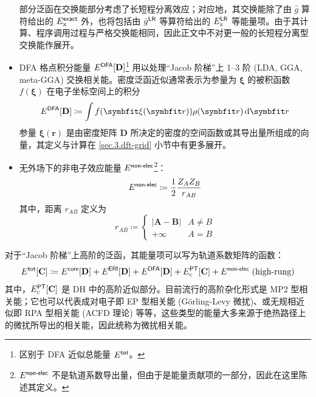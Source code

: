 \begin{itemize}[nosep]
\begin{equation}
\end{equation}
部分泛函在交换能部分考虑了长短程分离效应；对应地，其交换能除了由 $\hat g$ 算符给出的 $E_\mathrm{x}^{\textsf{exact}}$ 外，也将包括由 $\hat g^{\textsf{LR}}$ 等算符给出的 $E_\mathrm{x}^{\textsf{LR}}$ 等能量项。由于其计算、程序调用过程与严格交换能相同，因此正文中不对更一般的长短程分离型交换能作展开。
\item DFA 格点积分能量 $E^{\textsf{DFA}} [\mathbf{D}]$\footnote{区别于 DFA 近似总能量 $E^{\textsf{tot}}$。} 用以处理“Jacob 阶梯”上 1--3 阶 (LDA, GGA, meta-GGA) 交换相关能。密度泛函近似通常表示为参量为 $\bm{\xi}$ 的被积函数 $f(\bm{\xi})$ 在电子坐标空间上的积分
\begin{equation}
    \label{eq.3.def.dfa-energy}
    E^\textmt{DFA} [\mathbf{D}] \coloneq \int f(\bm{\xi}(\bm{r})) \rho (\bm{r}) \, \mathrm{d} \bm{r}
\end{equation}
参量 $\bm{\xi} (\bm{r})$ 是由密度矩阵 $\mathbf{D}$ 所决定的密度的空间函数或其导出量所组成的向量，其定义与计算在 \ref{sec.3.dft-grid} 小节中有更多展开。
\item 无外场下的非电子效应能量 $E^{\textsf{non-elec}}$\footnote{$E^{\textsf{non-elec}}$ 不是轨道系数导出量，但由于是能量贡献项的一部分，因此在这里陈述其定义。}：
\begin{equation}
    E^{\textsf{non-elec}} \coloneq \frac{1}{2} \frac{Z_A Z_B}{r_{AB}}
\end{equation}
其中，距离 $r_{AB}$ 定义为
\begin{equation*}
    r_{AB} \coloneq
    \begin{cases}
        | \boldsymbol{A} - \boldsymbol{B} | & A \neq B \\
        + \infty & A = B
    \end{cases}
\end{equation*}
\end{itemize}

对于“Jacob 阶梯”上高阶的泛函，其能量项可以写为轨道系数矩阵的函数：
\begin{equation}
    E^{\textsf{tot}}[\mathbf{C}] \coloneq E^{\textsf{core}} [\mathbf{D}] + E^{\textsf{ERI}} [\mathbf{D}] + E^{\textsf{DFA}} [\mathbf{D}] + E_\mathrm{c}^{\textsf{PT}} [\mathbf{C}] + E^{\textsf{non-elec}} \; \text{(high-rung)}
\end{equation}
其中，$E_\mathrm{c}^{\textsf{PT}} [\mathbf{C}]$ 是 DH 中的高阶近似部分。目前流行的高阶杂化形式是 MP2 型相关能；它也可以代表成对电子即 EP 型相关能 (G{\"o}rling-Levy 微扰)、或无规相近似即 RPA 型相关能 (ACFD 理论) 等等，这些类型的能量大多来源于绝热路径上的微扰所导出的相关能，因此统称为微扰相关能。

